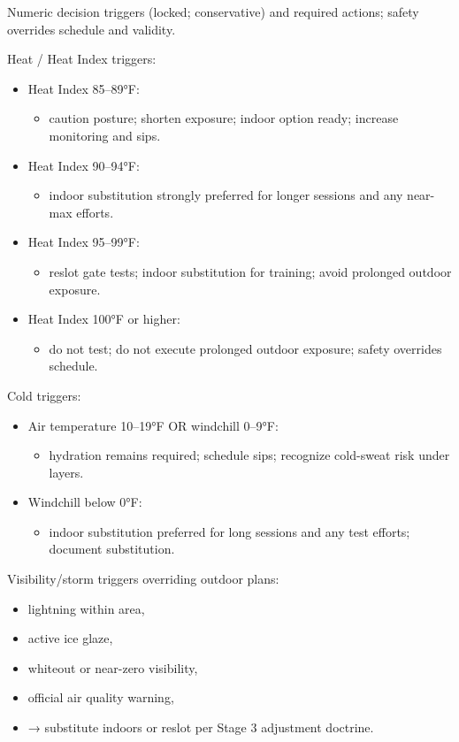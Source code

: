 \documentclass[10pt]{article}
\begin{document}
Numeric decision triggers (locked; conservative) and required actions; safety overrides schedule and validity.

Heat / Heat Index triggers:

\begin{itemize}
\item Heat Index 85–89°F:
  \begin{itemize}
  \item caution posture; shorten exposure; indoor option ready; increase monitoring and sips.
  \end{itemize}
\item Heat Index 90–94°F:
  \begin{itemize}
  \item indoor substitution strongly preferred for longer sessions and any near-max efforts.
  \end{itemize}
\item Heat Index 95–99°F:
  \begin{itemize}
  \item reslot gate tests; indoor substitution for training; avoid prolonged outdoor exposure.
  \end{itemize}
\item Heat Index 100°F or higher:
  \begin{itemize}
  \item do not test; do not execute prolonged outdoor exposure; safety overrides schedule.
  \end{itemize}
\end{itemize}

Cold triggers:

\begin{itemize}
\item Air temperature 10–19°F OR windchill 0–9°F:
  \begin{itemize}
  \item hydration remains required; schedule sips; recognize cold-sweat risk under layers.
  \end{itemize}
\item Windchill below 0°F:
  \begin{itemize}
  \item indoor substitution preferred for long sessions and any test efforts; document substitution.
  \end{itemize}
\end{itemize}

Visibility/storm triggers overriding outdoor plans:

\begin{itemize}
\item lightning within area,
\item active ice glaze,
\item whiteout or near-zero visibility,
\item official air quality warning,
\item → substitute indoors or reslot per Stage 3 adjustment doctrine.
\end{itemize}
\end{document}
